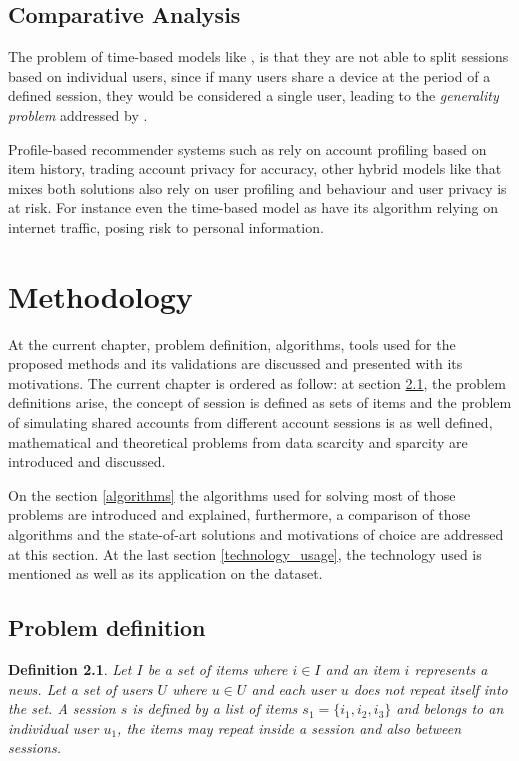 \documentclass[ecp,tc,english]{iiufrgs}
\newtheorem{definition}{Definition}
\begin{document}
\section{Comparative Analysis}
The problem of time-based models like \cite{halfaker2015, gill2008, sottocornola2018}, is that they are not able to split sessions based on individual users, since if many users share a device at the period of a defined session, they would be considered a single user, leading to the \textit{generality problem} addressed by \cite{verstrepen2015}.

Profile-based recommender systems such as \cite{zhang2019, verstrepen2015} rely on account profiling based on item history, trading account privacy for accuracy, other hybrid models like \cite{jindal2020, jiang2018} that mixes both solutions also rely on user profiling and behaviour and user privacy is at risk. For instance even the time-based model as \cite{gill2008} have its algorithm relying on internet traffic, posing risk to personal information.
    
    

\chapter{Methodology} \label{methodology}
At the current chapter, problem definition, algorithms, tools used for the proposed methods and its validations are discussed and presented with its motivations. The current chapter is ordered as follow: at section \ref{problem_definition}, the problem definitions arise, the concept of session is defined as sets of items and the problem of simulating shared accounts from different account sessions is as well defined, mathematical and theoretical problems from data scarcity and sparcity are introduced and discussed.

On the section \ref{algorithms} the algorithms used for solving most of those problems are introduced and explained, furthermore, a comparison of those algorithms and the state-of-art solutions and motivations of choice are addressed at this section. At the last section \ref{technology_usage}, the technology used is mentioned as well as its application on the dataset.

    \section{Problem definition} \label{problem_definition}
    \begin{definition}
    Let \(I \) be a set of items where \(i \in I \) and an item \(i\) represents a news. Let a set of users \(U\) where \(u \in U \) and each user \(u\) does not repeat itself into the set.
    A session \(s\) is defined by a list of items \(s_{1} = \{i_{1}, i_{2}, i_{3}\}\) and belongs to an individual user \(u_{1}\), the items may repeat inside a session and also between sessions.
    \end{definition}
    
\end{document}
